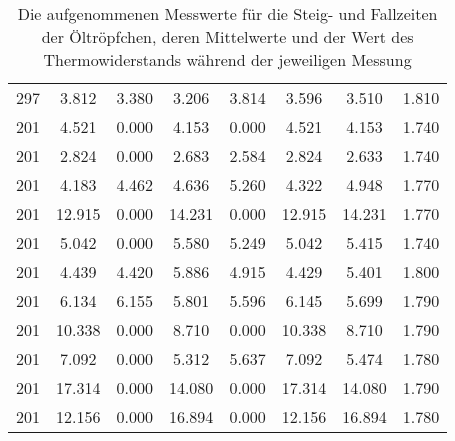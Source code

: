 \begin{table}[!h]
\begin{adjustbox}{width=\textwidth,center}
\begin{tabular}{|c|c|c|c|c|c|c|c|}
		\num{297} & \num{3.812} & \num{3.380} & \num{3.206} & \num{3.814} & \num{3.596} & \num{3.510} & \num{1.810}\\
		\num{201} & \num{4.521} & \num{0.000} & \num{4.153} & \num{0.000} & \num{4.521} & \num{4.153} & \num{1.740}\\
		\num{201} & \num{2.824} & \num{0.000} & \num{2.683} & \num{2.584} & \num{2.824} & \num{2.633} & \num{1.740}\\
		\num{201} & \num{4.183} & \num{4.462} & \num{4.636} & \num{5.260} & \num{4.322} & \num{4.948} & \num{1.770}\\
		\num{201} & \num{12.915} & \num{0.000} & \num{14.231} & \num{0.000} & \num{12.915} & \num{14.231} & \num{1.770}\\
		\num{201} & \num{5.042} & \num{0.000} & \num{5.580} & \num{5.249} & \num{5.042} & \num{5.415} & \num{1.740}\\
		\num{201} & \num{4.439} & \num{4.420} & \num{5.886} & \num{4.915} & \num{4.429} & \num{5.401} & \num{1.800}\\
		\num{201} & \num{6.134} & \num{6.155} & \num{5.801} & \num{5.596} & \num{6.145} & \num{5.699} & \num{1.790}\\
		\num{201} & \num{10.338} & \num{0.000} & \num{8.710} & \num{0.000} & \num{10.338} & \num{8.710} & \num{1.790}\\
		\num{201} & \num{7.092} & \num{0.000} & \num{5.312} & \num{5.637} & \num{7.092} & \num{5.474} & \num{1.780}\\
		\num{201} & \num{17.314} & \num{0.000} & \num{14.080} & \num{0.000} & \num{17.314} & \num{14.080} & \num{1.790}\\
		\num{201} & \num{12.156} & \num{0.000} & \num{16.894} & \num{0.000} & \num{12.156} & \num{16.894} & \num{1.780}\\
		\hline
		\end{tabular}
	\end{adjustbox}
	\caption{Die aufgenommenen Messwerte für die Steig- und Fallzeiten der Öltröpfchen, deren Mittelwerte und der Wert des Thermowiderstands während der jeweiligen Messung \label{tab:Auswertung_Messwerte}}
\end{table}
